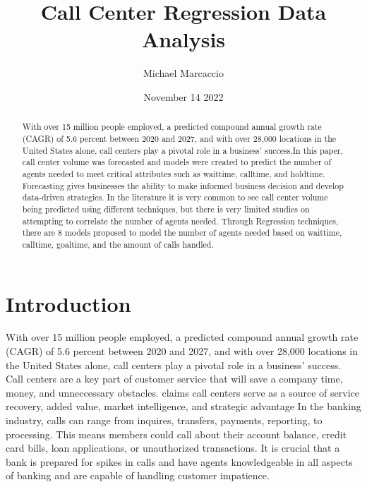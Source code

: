 \documentclass[12pt]{article}
\title{Call Center Regression Data Analysis}
\author{Michael Marcaccio}
\date{November 14 2022}
\begin{document}
\maketitle

\begin{abstract}
 With over 15 million people employed, a predicted compound annual growth rate (CAGR) of 5.6 percent between 2020 and 2027, and with over 28,000 locations
 in the United States alone, call centers play a pivotal role in a business' success.In this paper, call center volume was forecasted and
 models were created to predict the number of agents needed to meet critical attributes such as waittime, calltime, and holdtime. 
 Forecasting gives businesses the ability to make informed business decision and develop data-driven strategies. In the literature it is very
 common to see call center volume being predicted using different techniques, but there is very limited studies on attempting to correlate
 the number of agents needed. Through Regression techniques, there are 8 models proposed to model the number of agents needed based on waittime,
 calltime, goaltime, and the amount of calls handled.
\end{abstract}

\section*{Introduction}
  With over 15 million people employed, a predicted compound annual growth rate (CAGR) of 5.6 percent between 2020 and 2027, and with over 28,000 locations
in the United States alone, call centers play a pivotal role in a business' success. Call centers are a key part of customer service
that will save a company time, money, and unneccessary obstacles. \citep{feinberg2002operational} claims call centers serve as a source of service recovery, added value, market intelligence, and strategic advantage
In the banking industry, calls can range from inquires, transfers, payments, reporting, to processing. This means members could call about their account balance, credit card bills, loan applications, 
or unauthorized transactions. It is crucial that a bank is prepared for spikes in calls and have agents knowledgeable in all aspects of banking and are capable of handling customer impatience. \citep{brown2005statistical} 
\end{document}
